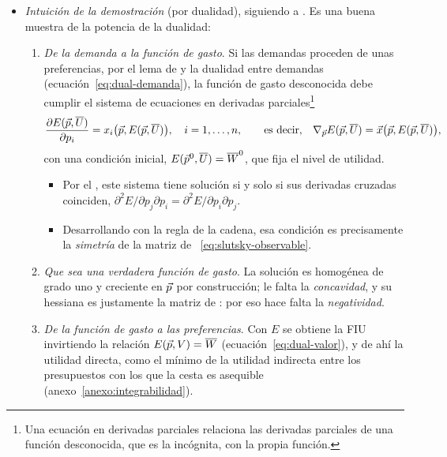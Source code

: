 \documentclass[11pt]{article}
\begin{document}
\begin{itemize}
\item \emph{Intuición de la demostración} (por dualidad), siguiendo a \textcite{HurwiczUzawa1971Integrability}. Es una buena muestra de la potencia de la dualidad:
  \begin{enumerate}
  \item \emph{De la demanda a la función de gasto}. Si las demandas proceden de unas preferencias, por el lema de  y la dualidad entre demandas (ecuación~\eqref{eq:dual-demanda}), la función de gasto desconocida debe cumplir el sistema de ecuaciones en derivadas parciales\footnote{Una ecuación en derivadas parciales relaciona las derivadas parciales de una función desconocida, que es la incógnita, con la propia función.}
    \begin{equation}
    \frac{\partial E(\vec{p},\overline{U})}{\partial p_i}=x_i\big(\vec{p},E(\vec{p},\overline{U})\big),\quad i=1,\dots,n,\qquad\text{es decir,}\quad\nabla_{\vec{p}}E(\vec{p},\overline{U})=\vec{x}\big(\vec{p},E(\vec{p},\overline{U})\big), \label{eq:edp-integrabilidad}
    \end{equation}
    con una condición inicial, $E(\vec{p}^0,\overline{U})=\overline{W}^0$, que fija el nivel de utilidad.
    \begin{itemize}
    \item Por el , este sistema tiene solución si y solo si sus derivadas cruzadas coinciden, $\partial^2E/\partial p_j\partial p_i=\partial^2E/\partial p_i\partial p_j$.
    \item Desarrollando con la regla de la cadena, esa condición es precisamente la \emph{simetría} de la matriz de ~\eqref{eq:slutsky-observable}\nocite{MasColellWhinstonGreen1995}.
    \end{itemize}
  \item \emph{Que sea una verdadera función de gasto}. La solución es homogénea de grado uno y creciente en $\vec{p}$ por construcción; le falta la \emph{concavidad}, y su hessiana es justamente la matriz de : por eso hace falta la \emph{negatividad}.
  \item \emph{De la función de gasto a las preferencias}. Con $E$ se obtiene la FIU invirtiendo la relación $E(\vec{p},V)=\overline{W}$ (ecuación~\eqref{eq:dual-valor}), y de ahí la utilidad directa, como el mínimo de la utilidad indirecta entre los presupuestos con los que la cesta es asequible (anexo~\ref{anexo:integrabilidad}).
  \end{enumerate}
\end{itemize}
\end{document}
